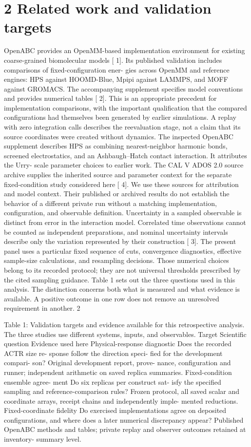 \documentclass[11pt]{article}
\begin{document}
\section*{2 Related work and validation targets}

OpenABC provides an OpenMM-based implementation environment for existing coarse-grained
biomolecular models [ 1]. Its published validation includes comparisons of fixed-configuration ener-
gies across OpenMM and reference engines: HPS against HOOMD-Blue, Mpipi against LAMMPS,
and MOFF against GROMACS. The accompanying supplement specifies model conventions and
provides numerical tables [ 2]. This is an appropriate precedent for implementation comparisons,
with the important qualification that the compared configurations had themselves been generated
by earlier simulations. A replay with zero integration calls describes the reevaluation stage, not a
claim that its source coordinates were created without dynamics.
The inspected OpenABC supplement describes HPS as combining nearest-neighbor harmonic
bonds, screened electrostatics, and an Ashbaugh–Hatch contact interaction. It attributes the Urry-
scale parameter choices to earlier work. The CAL V ADOS 2.0 source archive supplies the inherited
source and parameter context for the separate fixed-condition study considered here [ 4]. We use
these sources for attribution and model context. Their published or archived results do not establish
the behavior of a different private run without a matching implementation, configuration, and
observable definition.
Uncertainty in a sampled observable is distinct from error in the interaction model. Correlated
time observations cannot be counted as independent preparations, and nominal uncertainty intervals
describe only the variation represented by their construction [ 3]. The present panel uses a particular
fixed sequence of cuts, convergence diagnostics, effective sample-size calculations, and resampling
decisions. Those numerical choices belong to its recorded protocol; they are not universal thresholds
prescribed by the cited sampling guidance.
Table 1 sets out the three questions used in this analysis. The distinction concerns both what
is measured and what evidence is available. A positive outcome in one row does not remove an
unresolved requirement in another.
2

Table 1: Validation targets and evidence available for this retrospective analysis. The three studies
use different systems, inputs, and observables.
Target Scientific question Evidence used here
Physical-response
diagnostic
Does the recorded ACTR size re-
sponse follow the direction speci-
fied for the development compari-
son?
Original development report, prove-
nance, configuration and runner;
independent arithmetic on saved
replica summaries.
Fixed-condition
ensemble agree-
ment
Do six replicas per construct sat-
isfy the specified sampling and
reference-comparison rules?
Frozen protocol, all saved scalar
and coordinate arrays, receipt
chains and independently imple-
mented reductions.
Fixed-coordinate
fidelity
Do exercised implementations
agree on deposited configurations,
and where does a later numerical
discrepancy appear?
Published OpenABC methods and
tables; private replay and observer
outcomes retained at inventory-
summary level.
\end{document}
